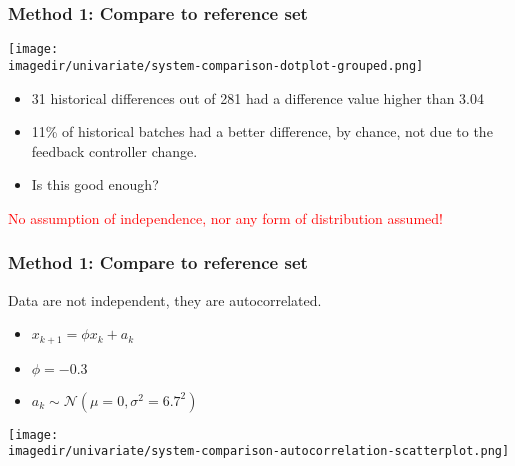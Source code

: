 \begin{frame}\frametitle{Method 1: Compare to reference set}

	\texttt{[image: \\imagedir/univariate/system-comparison-dotplot-grouped.png]}
	\begin{itemize}
		\item	31 historical differences out of 281 had a difference value higher than 3.04
		\item	11\% of historical batches had a better difference, by chance, not due to the feedback controller change.
		\item	Is this good enough?
	\end{itemize}

	\textcolor{red}{No assumption of independence, nor any form of distribution assumed!}
\end{frame}

\begin{frame}\frametitle{Method 1: Compare to reference set}

	Data are not independent, they are autocorrelated.
	\begin{itemize}
		\item	$x_{k+1} = \phi x_{k} + a_k$
		\item	$\phi = -0.3$
		\item	$a_k \sim \mathcal{N}\left(\mu=0, \sigma^2=6.7^2\right)$
	\end{itemize}
	\begin{center}
		\texttt{[image: \\imagedir/univariate/system-comparison-autocorrelation-scatterplot.png]}
	\end{center}
\end{frame}

